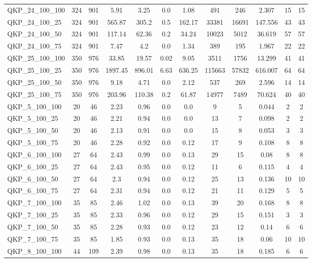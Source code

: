 \begin{table}[!h]
{\begin{tabular}{lccccccccccc}
QKP\_24\_100\_100 & 324 & 901 & 5.91 & 3.25 & 0.0 & 1.08 & 491 & 246 & 2.307 & 15 & 15\\
QKP\_24\_100\_25 & 324 & 901 & 565.87 & 305.2 & 0.5 & 162.17 & 33381 & 16691 & 147.556 & 43 & 43\\
QKP\_24\_100\_50 & 324 & 901 & 117.14 & 62.36 & 0.2 & 34.24 & 10023 & 5012 & 36.619 & 57 & 57\\
QKP\_24\_100\_75 & 324 & 901 & 7.47 & 4.2 & 0.0 & 1.34 & 389 & 195 & 1.967 & 22 & 22\\
QKP\_25\_100\_100 & 350 & 976 & 33.85 & 19.57 & 0.02 & 9.05 & 3511 & 1756 & 13.299 & 41 & 41\\
QKP\_25\_100\_25 & 350 & 976 & 1897.45 & 896.01 & 6.63 & 636.25 & 115663 & 57832 & 616.007 & 64 & 64\\
QKP\_25\_100\_50 & 350 & 976 & 9.18 & 4.71 & 0.0 & 2.12 & 537 & 269 & 2.596 & 14 & 14\\
QKP\_25\_100\_75 & 350 & 976 & 203.96 & 110.38 & 0.2 & 61.87 & 14977 & 7489 & 70.624 & 40 & 40\\
QKP\_5\_100\_100 & 20 & 46 & 2.23 & 0.96 & 0.0 & 0.0 & 9 & 5 & 0.044 & 2 & 2\\
QKP\_5\_100\_25 & 20 & 46 & 2.21 & 0.94 & 0.0 & 0.0 & 13 & 7 & 0.098 & 2 & 2\\
QKP\_5\_100\_50 & 20 & 46 & 2.13 & 0.91 & 0.0 & 0.0 & 15 & 8 & 0.053 & 3 & 3\\
QKP\_5\_100\_75 & 20 & 46 & 2.28 & 0.92 & 0.0 & 0.12 & 17 & 9 & 0.108 & 8 & 8\\
QKP\_6\_100\_100 & 27 & 64 & 2.43 & 0.99 & 0.0 & 0.13 & 29 & 15 & 0.08 & 8 & 8\\
QKP\_6\_100\_25 & 27 & 64 & 2.43 & 0.95 & 0.0 & 0.12 & 11 & 6 & 0.115 & 4 & 4\\
QKP\_6\_100\_50 & 27 & 64 & 2.3 & 0.94 & 0.0 & 0.12 & 25 & 13 & 0.136 & 10 & 10\\
QKP\_6\_100\_75 & 27 & 64 & 2.31 & 0.94 & 0.0 & 0.12 & 21 & 11 & 0.129 & 5 & 5\\
QKP\_7\_100\_100 & 35 & 85 & 2.46 & 1.02 & 0.0 & 0.13 & 39 & 20 & 0.168 & 8 & 8\\
QKP\_7\_100\_25 & 35 & 85 & 2.33 & 0.96 & 0.0 & 0.12 & 29 & 15 & 0.151 & 3 & 3\\
QKP\_7\_100\_50 & 35 & 85 & 2.28 & 0.93 & 0.0 & 0.12 & 23 & 12 & 0.14 & 6 & 6\\
QKP\_7\_100\_75 & 35 & 85 & 1.85 & 0.93 & 0.0 & 0.13 & 35 & 18 & 0.06 & 10 & 10\\
QKP\_8\_100\_100 & 44 & 109 & 2.39 & 0.98 & 0.0 & 0.13 & 35 & 18 & 0.185 & 6 & 6\\

\end{tabular}}
\end{table}
